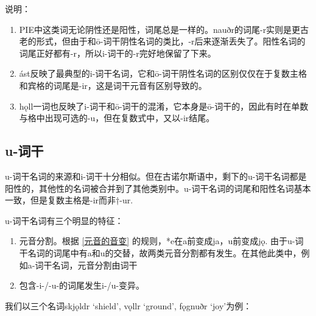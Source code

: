 说明：

\begin{enumerate}
  \item
        PIE中这类词无论阴性还是阳性，词尾总是一样的。nauðr的词尾-r实则是更古老的形式，但由于和ō-词干阴性名词的类比，-r后来逐渐丢失了。阳性名词的词尾正好都有-r，所以i-词干的-r完好地保留了下来。
  \item
        ást反映了最典型的i-词干名词，它和ō-词干阴性名词的区别仅仅在于复数主格和宾格的词尾是-ir，这是词干元音有区别导致的。
  \item
        hǫll一词也反映了i-词干和ō-词干的混淆，它本身是ō-词干的，因此有时在单数与格中出现可选的-u，但在复数式中，又以-ir结尾。
\end{enumerate}

\subsection{u-词干}
\label{u-词干}

u-词干名词的来源和i-词干十分相似。但在古诺尔斯语中，剩下的u-词干名词都是阳性的，其他性的名词被合并到了其他类别中。u-词干名词的词尾和阳性名词基本一致，但是复数主格是-ir而非†-ur.

u-词干名词有三个明显的特征：

\begin{enumerate}
  \item
        元音分割。根据 \ref{元音的音变} 的规则，*e在a前变成ja，u前变成jǫ.
        由于u-词干名词的词尾中有a和u的交替，故两类元音分割都有发生。在其他此类中，例如a-词干名词，元音分割由词干
  \item
        包含-i-/-u-的词尾发生i-/u-变异。
\end{enumerate}

我们以三个名词skjǫldr `shield', vǫllr `ground', fǫgnuðr `joy'为例：

